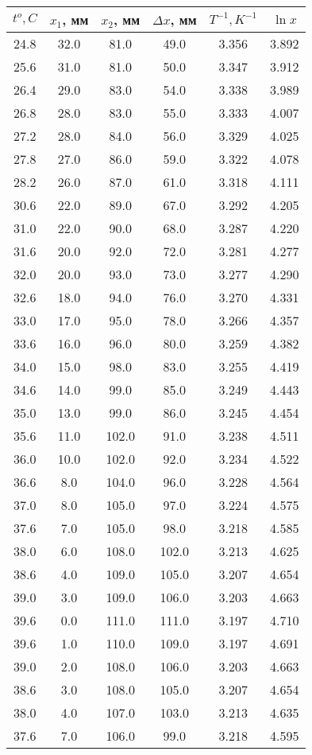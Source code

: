 \documentclass[12pt,a4paper]{article}
\begin{document}
\begin{center}
\begin{tabular}{| c  c  c  |  c  c  c |}
\hline
$t^{o},C$&$x_{1}$, мм&$x_{2}$, мм&$\Delta x$, мм&$T^{-1}, K^{-1}$&$\ln x $\\
\hline 
24.8&32.0&81.0&49.0&3.356&3.892\\ 
25.6&31.0&81.0&50.0&3.347&3.912\\ 
26.4&29.0&83.0&54.0&3.338&3.989\\ 
26.8&28.0&83.0&55.0&3.333&4.007\\ 
27.2&28.0&84.0&56.0&3.329&4.025\\ 
27.8&27.0&86.0&59.0&3.322&4.078\\ 
28.2&26.0&87.0&61.0&3.318&4.111\\ 
30.6&22.0&89.0&67.0&3.292&4.205\\ 
31.0&22.0&90.0&68.0&3.287&4.220\\ 
31.6&20.0&92.0&72.0&3.281&4.277\\ 
32.0&20.0&93.0&73.0&3.277&4.290\\ 
32.6&18.0&94.0&76.0&3.270&4.331\\ 
33.0&17.0&95.0&78.0&3.266&4.357\\ 
33.6&16.0&96.0&80.0&3.259&4.382\\ 
34.0&15.0&98.0&83.0&3.255&4.419\\ 
34.6&14.0&99.0&85.0&3.249&4.443\\ 
35.0&13.0&99.0&86.0&3.245&4.454\\ 
35.6&11.0&102.0&91.0&3.238&4.511\\ 
36.0&10.0&102.0&92.0&3.234&4.522\\ 
36.6&8.0&104.0&96.0&3.228&4.564\\ 
37.0&8.0&105.0&97.0&3.224&4.575\\ 
37.6&7.0&105.0&98.0&3.218&4.585\\ 
38.0&6.0&108.0&102.0&3.213&4.625\\ 
38.6&4.0&109.0&105.0&3.207&4.654\\ 
39.0&3.0&109.0&106.0&3.203&4.663\\ 
39.6&0.0&111.0&111.0&3.197&4.710\\ 
39.6&1.0&110.0&109.0&3.197&4.691\\ 
39.0&2.0&108.0&106.0&3.203&4.663\\ 
38.6&3.0&108.0&105.0&3.207&4.654\\ 
38.0&4.0&107.0&103.0&3.213&4.635\\ 
37.6&7.0&106.0&99.0&3.218&4.595\\ 

\end{tabular}
\end{center}
\end{document}

